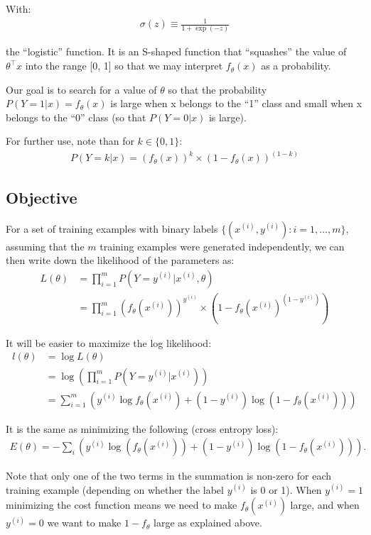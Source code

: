 With:
\begin{align}
	\sigma(z) \equiv \frac{1}{1 + \exp(-z)}
\end{align}

the “logistic” function. It is an S-shaped function that “squashes” the value of $\theta^\top x$ into the range [0, 1] so that we may interpret $f_\theta(x)$ as a probability. 

Our goal is to search for a value of $\theta$ so that the probability $P(Y=1|x) = f_\theta(x)$ is large when x belongs to the “1” class and small when x belongs to the “0” class (so that $P(Y=0|x)$ is large). 

For further use, note than for $k \in \{0,1\}$:
\begin{align}
	P(Y=k|x) = (f_\theta(x))^k \times (1 - f_\theta(x))^{(1-k)}
\end{align}

\subsection{Objective}
For a set of training examples with binary labels $\{ (x^{(i)}, y^{(i)}) : i=1,\ldots,m\}$, assuming that the $m$ training examples were generated independently, we can then write down the likelihood of the parameters as:
\begin{align}
	L(\theta) &= \prod_{i=1}^m P(Y=y^{(i)} | x^{(i)}, \theta) \\
			  &= \prod_{i=1}^m (f_\theta(x^{(i)}))^{y^{(i)}} \times (1 - f_\theta(x^{(i)})^{(1-y^{(i)})})
\end{align}

It will be easier to maximize the log likelihood:
\begin{align}
	l(\theta) &= \log L(\theta) \\
			  &= \log \left( \prod_{i=1}^m P(Y=y^{(i)} | x^{(i)}) \right) \\
			  &= \sum_{i=1}^m \left( y^{(i)}\log f_\theta(x^{(i)}) + (1-y^{(i)})\log (1 - f_\theta(x^{(i)})) \right)
\end{align}

It is the same as minimizing the following (cross entropy loss):
\begin{align}
	E(\theta) = - \sum_i \left(y^{(i)} \log( f_\theta(x^{(i)}) ) + (1 - y^{(i)}) \log( 1 - f_\theta(x^{(i)}) ) \right).
\end{align}


Note that only one of the two terms in the summation is non-zero for each training example (depending on whether the label $y^{(i)}$ is 0 or 1). When $y^{(i)} = 1$ minimizing the cost function means we need to make $f_\theta(x^{(i)})$ large, and when $y^{(i)} = 0$ we want to make $1 - f_\theta$ large as explained above.

